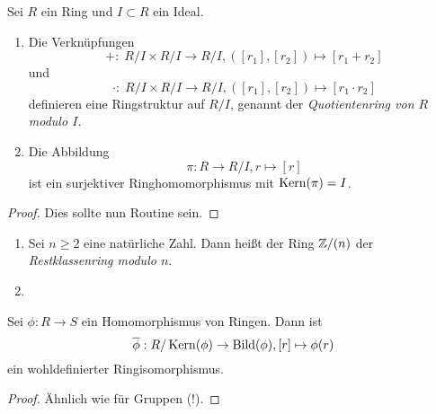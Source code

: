 \documentclass{book}
\begin{document}
\begin{prop}
    \label{prop:quot} Sei $R$ ein Ring und $I \subset R$ ein Ideal.
    \begin{enumerate}
        \item Die Verknüpfungen 
            \[
                +: \; R/I \times R/I \to R/I, ([r_1],[r_2]) \mapsto [r_1+r_2]
            \]
            und
            \[
                \cdot: \; R/I \times R/I \to R/I, ([r_1],[r_2]) \mapsto [r_1 \cdot r_2]
            \]
            definieren eine Ringstruktur auf $R/I$, genannt der \emph{Quotientenring von
            $R$ modulo $I$.} 
        \item Die Abbildung 
            \[
                \pi: R \to R/I, r \mapsto [r]
            \]
            ist ein surjektiver Ringhomomorphismus mit $\operatorname{Kern}(\pi) = I$. 
    \end{enumerate}
\end{prop}
\begin{proof}
   Dies sollte nun Routine sein. 
\end{proof}

\begin{exas}
    \label{exa:restklassen}
    \begin{enumerate}
    		\item {} Sei $n \ge 2$ eine natürliche Zahl. Dann heißt der Ring $\mathbb{Z}/(n)$ der \emph{Restklassenring modulo $n$}.
    		\item {}
    \end{enumerate}
\end{exas}


\begin{thm}
    \label{thm:haupthom}
    Sei $\phi: R \to S$ ein Homomorphismus von Ringen. Dann ist 
    \[
        \overline{\phi}: R/\Kern(\phi) \to \Bild(\phi), [r] \mapsto \phi(r)
    \]
    ein wohldefinierter Ringisomorphismus.
\end{thm}
\begin{proof}
    Ähnlich wie für Gruppen (!).
\end{proof}
\end{document}
